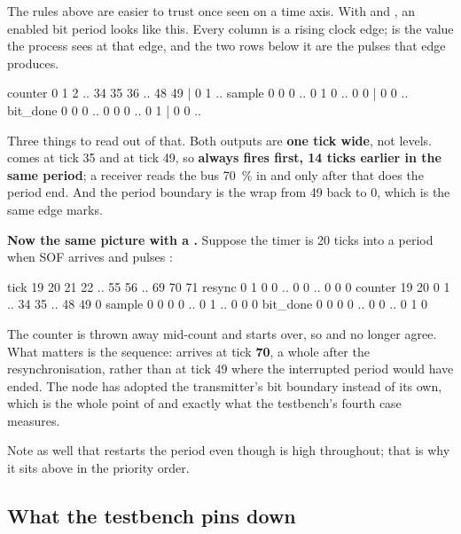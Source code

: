 The rules above are easier to trust once seen on a time axis. With  and
, an enabled bit period looks like this. Every column is a rising clock edge;
 is the value the process sees at that edge, and the two rows below it are the pulses
that edge produces.

\begin{textdrawing}
counter      0   1   2  ..  34  35  36  ..  48  49   |   0   1  ..
sample       0   0   0  ..   0   1   0  ..   0   0   |   0   0  ..
bit_done     0   0   0  ..   0   0   0  ..   0   1   |   0   0  ..
\end{textdrawing}

Three things to read out of that. Both outputs are \textbf{one tick wide}, not levels. 
comes at tick 35 and  at tick 49, so \textbf{ always fires first, 14
ticks earlier in the same period}; a receiver reads the bus 70~\% in and only after that does the
period end. And the period boundary is the wrap from 49 back to 0, which is the same edge
 marks.

\textbf{Now the same picture with a .} Suppose the timer is 20 ticks into a period when
SOF arrives and  pulses :

\begin{textdrawing}
tick        19  20  21  22  ..  55  56  ..  69  70  71
resync       0   1   0   0  ..   0   0  ..   0   0   0
counter     19  20   0   1  ..  34  35  ..  48  49   0
sample       0   0   0   0  ..   0   1  ..   0   0   0
bit_done     0   0   0   0  ..   0   0  ..   0   1   0
\end{textdrawing}

The counter is thrown away mid-count and starts over, so  and  no longer
agree. What matters is the sequence:  arrives at tick \textbf{70}, a whole
 after the resynchronisation, rather than at tick 49 where the interrupted period
would have ended. The node has adopted the transmitter's bit boundary instead of its own, which is
the whole point of  and exactly what the testbench's fourth case measures.

Note as well that  restarts the period even though  is high throughout;
that is why it sits above  in the priority order.

\subsection{What the testbench pins down}
\label{c12:sub:bttb}

